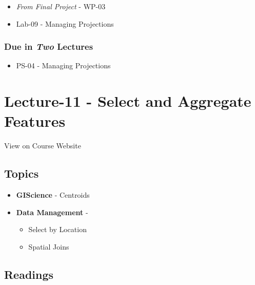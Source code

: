 \documentclass[]{book}
\providecommand{\tightlist}{%
  \setlength{\itemsep}{0pt}\setlength{\parskip}{0pt}}
\begin{document}
\begin{itemize}
\tightlist
\item
  \emph{From Final Project} - WP-03
\item
  Lab-09 - Managing Projections
\end{itemize}

\hypertarget{due-in-two-lectures-3}{%
\subsubsection*{\texorpdfstring{Due in \emph{Two} Lectures}{Due in Two Lectures}}\label{due-in-two-lectures-3}}

\begin{itemize}
\tightlist
\item
  PS-04 - Managing Projections
\end{itemize}

\hypertarget{lecture-11---select-and-aggregate-features}{%
\section*{Lecture-11 - Select and Aggregate Features}\label{lecture-11---select-and-aggregate-features}}

View on Course Website

\hypertarget{topics-11}{%
\subsection*{Topics}\label{topics-11}}

\begin{itemize}
\tightlist
\item
  \textbf{GIScience} - Centroids
\item
  \textbf{Data Management} -

  \begin{itemize}
  \tightlist
  \item
    Select by Location
  \item
    Spatial Joins
  \end{itemize}
\end{itemize}

\hypertarget{readings-11}{%
\subsection*{Readings}\label{readings-11}}
\end{document}
